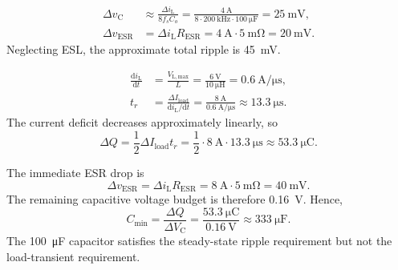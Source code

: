 
\begin{solutionblock}
    \begin{align}
        \Delta v_\mathrm{C}&\approx \frac{\Delta i_\mathrm{L}}{8f_sC_o} = \frac{\SI{4}{\ampere}}
        {8\cdot\SI{200}{\kilo\hertz}\cdot\SI{100}{\micro\farad}}
        =\SI{25}{\milli\volt},\\
        \Delta v_\mathrm{ESR}&=\Delta i_\mathrm{L} R_\mathrm{ESR}=\SI{4}{\ampere}\cdot\SI{5}{\milli\ohm}
        =\SI{20}{\milli\volt}.
    \end{align}
    Neglecting ESL, the approximate total ripple is \SI{45}{\milli\volt}.
\end{solutionblock}


\begin{solutionblock}
    \begin{align}
        \frac{\mathrm{d}i_\mathrm{L}}{\mathrm{d}t}
        &=\frac{V_\mathrm{L, max}}{L}=\frac{\SI{6}{\volt}}{\SI{10}{\micro\henry}}
        =\SI{0.6}{\ampere\per\micro\second},\\
        t_r&=\frac{\Delta I_\mathrm{load}}{\mathrm{d}i_\mathrm{L} / \mathrm{d}t}
            =\frac{\SI{8}{\ampere}}{\SI{0.6}{\ampere\per\micro\second}}
        \approx\SI{13.3}{\micro\second}.
    \end{align}
    The current deficit decreases approximately linearly, so
    \begin{equation}
        \Delta Q=\frac{1}{2}\Delta I_\mathrm{load}t_r
        =\frac{1}{2}\cdot\SI{8}{\ampere}\cdot\SI{13.3}{\micro\second}
        \approx\SI{53.3}{\micro\coulomb}.
    \end{equation}
\end{solutionblock}


\begin{solutionblock}
    The immediate ESR drop is
    \begin{equation}
        \Delta v_\mathrm{ESR}=\Delta i_\mathrm{L} R_\mathrm{ESR}=\SI{8}{\ampere}\cdot\SI{5}{\milli\ohm}
        =\SI{40}{\milli\volt}.
    \end{equation}
    The remaining capacitive voltage budget is therefore
    \SI{0.16}{\volt}. Hence,
    \begin{equation}
        C_\mathrm{min}=\frac{\Delta Q}{\Delta V_\mathrm{C}}
        =\frac{\SI{53.3}{\micro\coulomb}}{\SI{0.16}{\volt}}
        \approx\SI{333}{\micro\farad}.
    \end{equation}
    The \SI{100}{\micro\farad} capacitor satisfies the steady-state ripple
    requirement but not the load-transient requirement.
\end{solutionblock}

